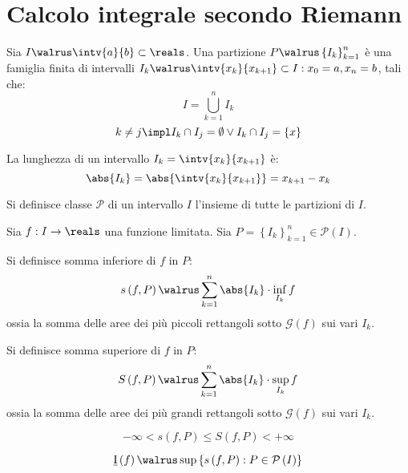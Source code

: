 \section[Calcolo integrale]{Calcolo integrale secondo Riemann}

\begin{definition}
  Sia $I\walrus\intv{a}{b}\subset\reals$. Una partizione $P\walrus\left\{ I_k \right\}_{k=1}^n$ è una famiglia finita di intervalli $I_k\walrus\intv{x_k}{x_{k+1}}\subset I:x_0=a,x_n=b$, tali che:
  $$I=\bigcup_{k=1}^nI_k$$
  $$k\neq j\impl I_k\cap I_j=\emptyset \vee I_k \cap I_j=\left\{ x \right\}$$
\end{definition}

\begin{definition}
  La lunghezza di un intervallo $I_k=\intv{x_k}{x_{k+1}}$ è:
  $$\abs{I_k}=\abs{\intv{x_k}{x_{k+1}}}=x_{k+1}-x_k$$
\end{definition}

\begin{definition}
  Si definisce classe $\mathcal{P}$ di un intervallo $I$ l'insieme di tutte le partizioni di $I$.
\end{definition}

\begin{definition}
  Sia $f:I\to\reals$ una funzione limitata.
  Sia $P=\left\{ I_k \right\}_{k=1}^n\in\mathcal{P}\left( I \right)$.
  
  \noindent Si definisce somma inferiore di $f$ in $P$:
  $$s\left( f,P \right)\walrus \sum_{k=1}^n\abs{I_k}\cdot \inf_{I_k}f$$
  ossia la somma delle aree dei più piccoli rettangoli sotto $\mathcal{G}\left( f \right)$ sui vari $I_k$.
  
  \noindent Si definisce somma superiore di $f$ in $P$:
  $$S\left( f,P \right)\walrus \sum_{k=1}^n\abs{I_k}\cdot \sup_{I_k}f$$
  ossia la somma delle aree dei più grandi rettangoli sotto $\mathcal{G}\left( f \right)$
  sui vari $I_k$.
\end{definition}

\begin{observation}
  $$-\infty<s\left( f,P \right)\le S\left( f,P \right)<+\infty$$
\end{observation}

\begin{definition}
  $$\underbar{I}\left( f \right)\walrus \sup\left\{ s\left( f,P \right):P\in \mathcal{P}\left( I \right) \right\}$$
\end{definition}

